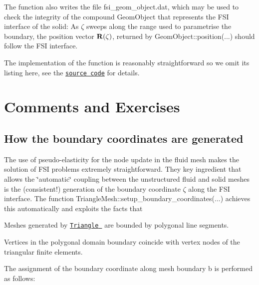 The function also writes the file {\ttfamily fsi\+\_\+geom\+\_\+object.\+dat}, which may be used to check the integrity of the compound {\ttfamily Geom\+Object} that represents the F\+SI interface of the solid\+: As $ \zeta $ sweeps along the range used to parametrise the boundary, the position vector $ {\bf R}(\zeta) $, returned by {\ttfamily Geom\+Object\+::position}(...) should follow the F\+SI interface.

The implementation of the function is reasonably straightforward so we omit its listing here, see the \href{../../../../demo_drivers/interaction/unstructured_fsi/unstructured_two_d_fsi.cc}{\tt source code} for details.



 

\hypertarget{index_comm_ex}{}\section{Comments and Exercises}\label{index_comm_ex}
\hypertarget{index_boundary_coord}{}\subsection{How the boundary coordinates are generated}\label{index_boundary_coord}
The use of pseudo-\/elasticity for the node update in the fluid mesh makes the solution of F\+SI problems extremely straightforward. They key ingredient that allows the \char`\"{}automatic\char`\"{} coupling between the unstructured fluid and solid meshes is the (consistent!) generation of the boundary coordinate $ \zeta $ along the F\+SI interface. The function {\ttfamily Triangle\+Mesh\+::setup\+\_\+boundary\+\_\+coordinates}(...) achieves this automatically and exploits the facts that
\begin{DoxyEnumerate}
\item Meshes generated by \href{http://www.cs.cmu.edu/~quake/triangle.html}{\tt {\ttfamily Triangle} } are bounded by polygonal line segments.
\item Vertices in the polygonal domain boundary coincide with vertex nodes of the triangular finite elements.
\end{DoxyEnumerate}The assignment of the boundary coordinate along mesh boundary {\ttfamily b} is performed as follows\+:
